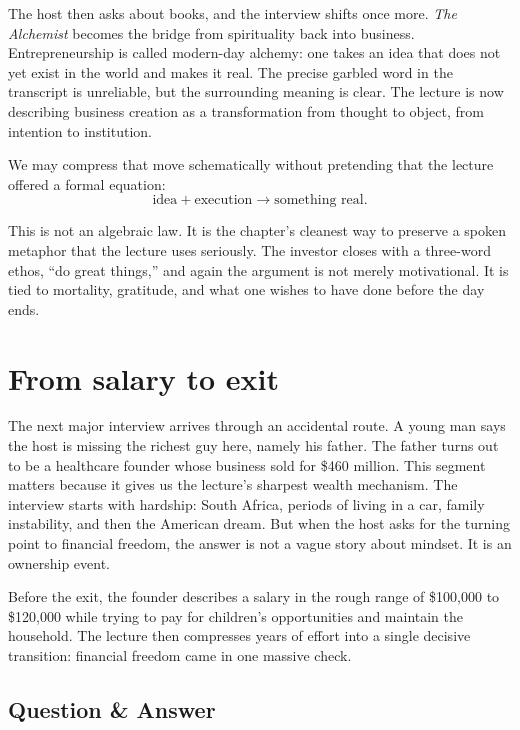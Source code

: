 The host then asks about books, and the interview shifts once more. \emph{The Alchemist} becomes the bridge from spirituality back into business. Entrepreneurship is called modern-day alchemy: one takes an idea that does not yet exist in the world and makes it real. The precise garbled word in the transcript is unreliable, but the surrounding meaning is clear. The lecture is now describing business creation as a transformation from thought to object, from intention to institution.

We may compress that move schematically without pretending that the lecture offered a formal equation:
\begin{equation}
\text{idea} + \text{execution} \longrightarrow \text{something real}.
\end{equation}

This is not an algebraic law. It is the chapter's cleanest way to preserve a spoken metaphor that the lecture uses seriously. The investor closes with a three-word ethos, ``do great things,'' and again the argument is not merely motivational. It is tied to mortality, gratitude, and what one wishes to have done before the day ends.

\section{From salary to exit}

The next major interview arrives through an accidental route. A young man says the host is missing the richest guy here, namely his father. The father turns out to be a healthcare founder whose business sold for \$460 million. This segment matters because it gives us the lecture's sharpest wealth mechanism. The interview starts with hardship: South Africa, periods of living in a car, family instability, and then the American dream. But when the host asks for the turning point to financial freedom, the answer is not a vague story about mindset. It is an ownership event.

Before the exit, the founder describes a salary in the rough range of \$100{,}000 to \$120{,}000 while trying to pay for children's opportunities and maintain the household. The lecture then compresses years of effort into a single decisive transition: financial freedom came in one massive check.

\subsection{Question \& Answer}


